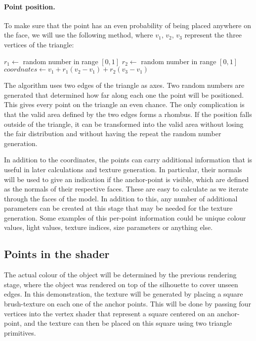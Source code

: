 \documentclass[a4paper, 12pt]{article}
\begin{document}
\paragraph{Point position.}
To make sure that the point has an even probability of being placed anywhere on the face, we will use the following method, where $v_1$, $v_2$, $v_3$ represent the three vertices of the triangle:

\begin{algorithm}[H]
$r_1 \leftarrow$ random number in range $[0,1]$\;
$r_2 \leftarrow$ random number in range $[0,1]$\;
$coordnates \leftarrow v_1 + r_1(v_2-v_1) + r_2(v_3-v_1)$
\end{algorithm}

The algorithm uses two edges of the triangle as axes. Two random numbers are generated that determined how far along each one the point will be positioned. This gives every point on the triangle an even chance. The only complication is that the valid area defined by the two edges forms a rhombus. If the position falls outside of the triangle, it can be transformed into the valid area without losing the fair distribution and without having the repeat the random number generation.

In addition to the coordinates, the points can carry additional information that is useful in later calculations and texture generation. In particular, their normals will be used to give an indication if the anchor-point is visible, which are defined as the normals of their respective faces. These are easy to calculate as we iterate through the faces of the model. In addition to this, any number of additional parameters can be created at this stage that may be needed for the texture generation. Some examples of this per-point information could be unique colour values, light values, texture indices, size parameters or anything else.


\subsection{Points in the shader}
The actual colour of the object will be determined by the previous rendering stage, where the object was rendered on top of the silhouette to cover unseen edges. In this demonstration, the texture will be generated by placing a square brush-texture on each one of the anchor points. This will be done by passing four vertices into the vertex shader that represent a square centered on an anchor-point, and the texture can then be placed on this square using two triangle primitives.
\end{document}

